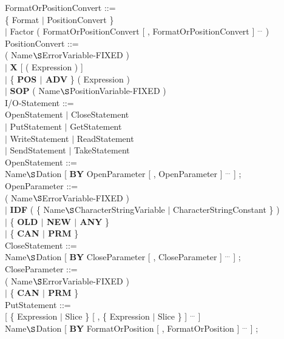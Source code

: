 FormatOrPositionConvert ::= \\
\x [ Factor ] \{ Format $\mid$ PositionConvert \}\\
\x $\mid$ Factor ( FormatOrPositionConvert [ , FormatOrPositionConvert ] $^{...}$ )\\

PositionConvert ::= \\
 ( Name$\S $ErrorVariable-FIXED )\\
\x $\mid$ {\bf X} [ ( Expression ) ]\\
\x $\mid$ \{ {\bf POS $\mid$ ADV} \} ( Expression )\\
\x $\mid$ {\bf SOP} ( Name$\S $PositionVariable-FIXED )\\

I/O-Statement ::=\\
\x OpenStatement $\mid$ CloseStatement\\
\x $\mid$ PutStatement $\mid$ GetStatement\\
\x $\mid$ WriteStatement $\mid$ ReadStatement\\
\x $\mid$ SendStatement $\mid$ TakeStatement\\
         
OpenStatement ::=\\
 Name$\S $Dation [ {\bf BY} OpenParameter [ , OpenParameter ] $^{...}$ ] ;\\

OpenParameter ::=\\
 ( Name$\S $ErrorVariable-FIXED )\\
\x $\mid$ {\bf IDF} ( \{ Name$\S $CharacterStringVariable $\mid$ CharacterStringConstant \} )\\
\x $\mid$ \{ {\bf OLD $\mid$ NEW $\mid$ ANY} \}\\
\x $\mid$ \{ {\bf CAN $\mid$ PRM} \}\\

CloseStatement ::=\\ 
 Name$\S $Dation [ {\bf BY} CloseParameter [ , CloseParameter ] $^{...}$ ] ;\\

CloseParameter ::=\\
 ( Name$\S $ErrorVariable-FIXED )\\
\x $\mid$ \{ {\bf CAN $\mid$ PRM} \}\\

PutStatement ::=\\
 [ \{ Expression $\mid$ Slice \} [ , \{ Expression $\mid$ Slice \} ] $^{...}$ ]\\
 Name$\S $Dation [ {\bf BY} FormatOrPosition [ , FormatOrPosition ] $^{...}$ ] ;\\


